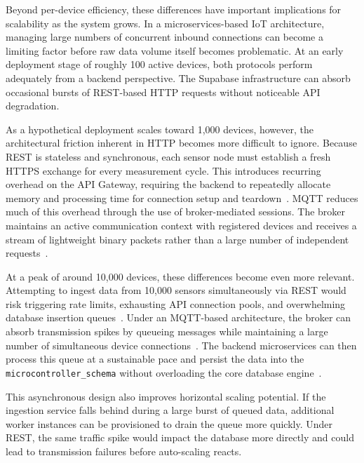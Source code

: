 Beyond per-device efficiency, these differences have important implications for scalability as the system grows. In a microservices-based IoT architecture, managing large numbers of concurrent inbound connections can become a limiting factor before raw data volume itself becomes problematic. At an early deployment stage of roughly 100 active devices, both protocols perform adequately from a backend perspective. The Supabase infrastructure can absorb occasional bursts of REST-based HTTP requests without noticeable API degradation.

As a hypothetical deployment scales toward 1,000 devices, however, the architectural friction inherent in HTTP becomes more difficult to ignore. Because REST is stateless and synchronous, each sensor node must establish a fresh HTTPS exchange for every measurement cycle. This introduces recurring overhead on the API Gateway, requiring the backend to repeatedly allocate memory and processing time for connection setup and teardown~\cite{fieldingRest2000, rfc7230Http, rfc8446Tls}. MQTT reduces much of this overhead through the use of broker-mediated sessions. The broker maintains an active communication context with registered devices and receives a stream of lightweight binary packets rather than a large number of independent requests~\cite{oasisMQTT, yokotaniSasaki2016MqttHttp, thangavel2014mqttCoap, seoane2021CoapMqttSecurity}.

At a peak of around 10,000 devices, these differences become even more relevant. Attempting to ingest data from 10,000 sensors simultaneously via REST would risk triggering rate limits, exhausting API connection pools, and overwhelming database insertion queues~\cite{awsApiLimits, nginxWorkerLimits}. Under an MQTT-based architecture, the broker can absorb transmission spikes by queueing messages while maintaining a large number of simultaneous device connections~\cite{oasisMQTT}. The backend microservices can then process this queue at a sustainable pace and persist the data into the \texttt{microcontroller\_schema} without overloading the core database engine~\cite{thangavel2014mqttCoap, seoane2021CoapMqttSecurity, yamin2018MqttCoap, jara2023mqtt}.

This asynchronous design also improves horizontal scaling potential. If the ingestion service falls behind during a large burst of queued data, additional worker instances can be provisioned to drain the queue more quickly. Under REST, the same traffic spike would impact the database more directly and could lead to transmission failures before auto-scaling reacts.

